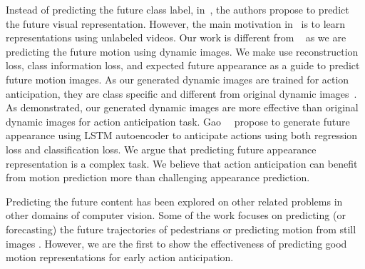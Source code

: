 Instead of predicting the future class label, in~\cite{vondrick2016anticipating}, the authors propose to predict the future visual representation. However, the main motivation in~\cite{vondrick2016anticipating} is to learn representations using unlabeled videos. Our work is different from ~\cite{vondrick2016anticipating} as we are predicting the future motion using dynamic images. We make use reconstruction loss, class information loss, and expected future appearance as a guide to predict future motion images. As our generated dynamic images are trained for action anticipation, they are class specific and different from original dynamic images~\cite{bilen2016dynamic}. As demonstrated, our generated dynamic images are more effective than original dynamic images for action anticipation task. Gao~\etal~\cite{gao2017red} propose to generate future appearance using LSTM autoencoder to anticipate actions using both regression loss and classification loss. We argue that predicting future appearance representation is a complex task. We believe that action anticipation can benefit from motion prediction more than challenging appearance prediction.

Predicting the future content has been explored on other related problems in other domains of computer vision. Some of the work focuses on predicting (or forecasting) the future trajectories of pedestrians \cite{kitani2012activity} or predicting motion from still images \cite{kitani2012activity,pellegrini2009you}. However, we are the first to show the effectiveness of predicting good motion representations for early action anticipation.